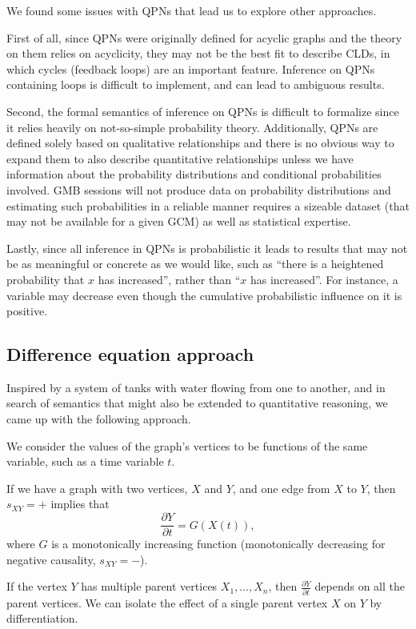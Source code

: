 We found some issues with QPNs that lead us to explore other
approaches.

First of all, since QPNs were originally defined for acyclic graphs
and the theory on them relies on acyclicity, they may not be the best
fit to describe CLDs, in which cycles (feedback loops) are an
important feature.
%
Inference on QPNs containing loops is difficult to implement, and can
lead to ambiguous results.

Second, the formal semantics of inference on QPNs is difficult to
formalize since it relies heavily on not-so-simple probability theory.
%
Additionally, QPNs are defined solely based on qualitative
relationships and there is no obvious way to expand them to also
describe quantitative relationships unless we have information about
the probability distributions and conditional probabilities involved.
%
GMB sessions will not produce data on probability distributions and
estimating such probabilities in a reliable manner requires a sizeable
dataset (that may not be available for a given GCM) as well as
statistical expertise.

Lastly, since all inference in QPNs is probabilistic it leads to
results that may not be as meaningful or concrete as we would like,
such as ``there is a heightened probability that $x$ has increased'',
rather than ``$x$ has increased''.
%
For instance, a variable may decrease even though the cumulative
probabilistic influence on it is positive.

\subsection{Difference equation approach}

Inspired by a system of tanks with water flowing from one to another,
and in search of semantics that might also be extended to quantitative
reasoning, we came up with the following approach.

We consider the values of the graph's vertices to be functions of the
same variable, such as a time variable $t$.

If we have a graph with two vertices, $X$ and $Y$, and one edge from
$X$ to $Y$, then $s_{XY}=+$ implies that
%
\[\frac{\partial Y}{\partial t} = G(X(t)),\]
%
where $G$ is a monotonically increasing function (monotonically decreasing for negative
causality, $s_{XY}=-$).

If the vertex $Y$ has multiple parent vertices $X_1,\ldots,X_n$, then
$\frac{\partial Y}{\partial t}$ depends on all the parent vertices.
%
We can isolate the effect of a single parent vertex $X$ on $Y$ by
differentiation.

